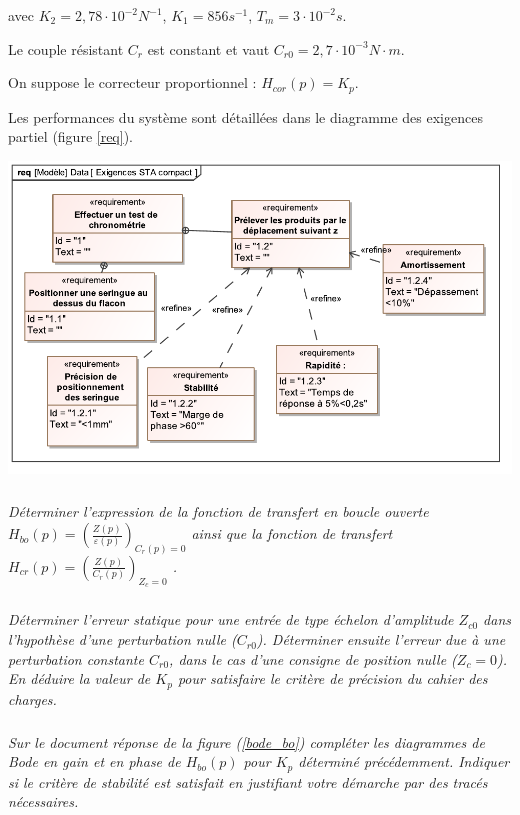 \documentclass[10pt,fleqn]{article} %
\begin{document}
\begin{multicols}{2}
avec $K_2 = 2,78 \cdot 10^{-2} N^{-1}$, $K_1 = 856 s^{-1}$, $T_m= 3\cdot  10^{-2} s$.

Le couple résistant $C_r$ est constant et vaut $C_{r0} = 2,7 \cdot 10^{-3} N\cdot m$.

On suppose le correcteur proportionnel : $H_{cor}(p)=K_p$.

Les performances du système sont détaillées dans le diagramme des exigences partiel (figure \ref{req}). 


	\begin{center}
			\includegraphics[width=1.0\linewidth]{images/req.pdf}
    \end{center}


\subparagraph{}\textit{Déterminer l'expression de la fonction de transfert en boucle ouverte $H_{bo}(p)=\left(\frac{Z(p)}{\varepsilon(p)}\right)_{C_r(p)=0}$ ainsi que la fonction de transfert $H_{cr}(p)=\left(\frac{Z(p)}{C_r(p)}\right)_{Z_c=0}$
.}

\subparagraph{}\textit{Déterminer l'erreur statique pour une entrée de type échelon d'amplitude $Z_{c0}$ dans l'hypothèse d'une perturbation nulle ($C_{r0}$). Déterminer ensuite l'erreur due à une perturbation constante $C_{r0}$, dans le cas d'une
consigne de position nulle ($Z_c=0$). En déduire la valeur de $K_p$ pour satisfaire le critère de précision du cahier des charges.}


\subparagraph{}\textit{Sur le document réponse de la figure (\ref{bode_bo}) compléter les diagrammes de Bode en gain et en phase de $H_{bo}(p)$ pour $K_p$ déterminé précédemment. Indiquer si le critère de stabilité est satisfait en justifiant votre démarche par des tracés nécessaires.}


\end{multicols}
\end{document}
